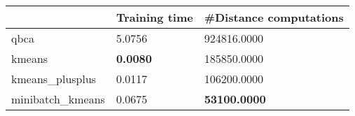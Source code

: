\begin{table}[htbp]
\centering
\begin{tabular}{lll}
\toprule
 & Training time & #Distance computations \\
\midrule
qbca & 5.0756 & 924816.0000 \\
kmeans & \textbf{0.0080} & 185850.0000 \\
kmeans_plusplus & 0.0117 & 106200.0000 \\
minibatch_kmeans & 0.0675 & \textbf{53100.0000} \\
\bottomrule
\end{tabular}
\end{table}
